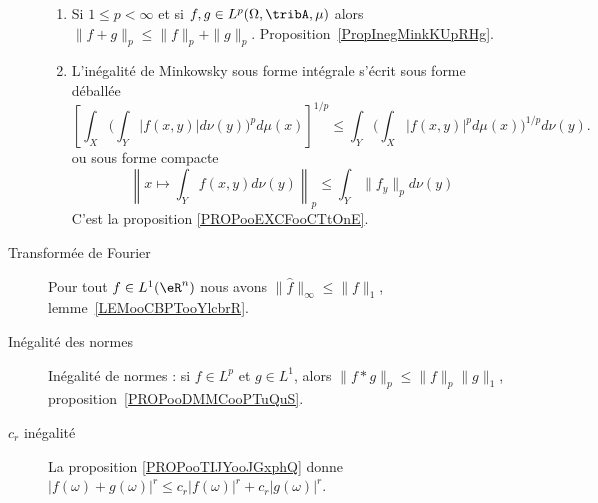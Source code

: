 \begin{description}
\begin{enumerate}
			\item
			      Si \( 1\leq p<\infty\) et si \( f,g\in L^p(\Omega,\tribA,\mu)\) alors \(  \| f+g \|_p\leq \| f \|_p+\| g \|_p\). Proposition~\ref{PropInegMinkKUpRHg}.
			\item
			      L'inégalité de Minkowsky sous forme intégrale s'écrit sous forme déballée
			      \begin{equation*}
				      \left[ \int_X\Big( \int_Y| f(x,y) |d\nu(y) \Big)^pd\mu(x) \right]^{1/p}\leq \int_Y\Big( \int_X| f(x,y) |^pd\mu(x) \Big)^{1/p}d\nu(y).
			      \end{equation*}
			      ou sous forme compacte
			      \begin{equation*}
				      \left\|   x\mapsto\int_Y f(x,y)d\nu(y)   \right\|_p\leq \int_Y  \| f_y \|_pd\nu(y)
			      \end{equation*}
			      C'est la proposition \ref{PROPooEXCFooCTtOnE}.
		\end{enumerate}
	\item[Transformée de Fourier]
		Pour tout \( f\in L^1(\eR^n)\) nous avons \( \| \hat f \|_{\infty}\leq \| f \|_1\), lemme~\ref{LEMooCBPTooYlcbrR}.
	\item[Inégalité des normes]
		Inégalité de normes : si \( f\in L^p\) et \( g\in L^1\), alors \( \| f*g \|_p\leq \| f \|_p\| g \|_1\), proposition~\ref{PROPooDMMCooPTuQuS}.
	\item[\( c_r\) inégalité] La proposition \ref{PROPooTIJYooJGxphQ} donne \( \big|  f(\omega)+g(\omega)  \big|^r\leq  c_r| f(\omega) |^r+c_r| g(\omega) |^r \).
\end{description}
